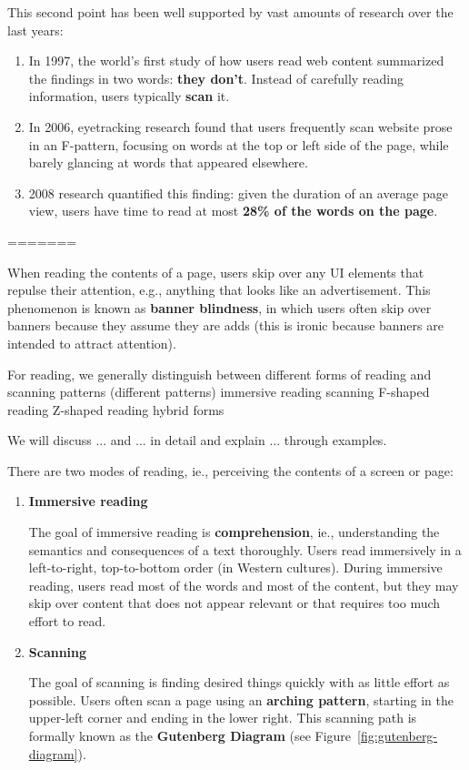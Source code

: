 This second point has been well supported by vast amounts of research over the last years:
\begin{enumerate}
	\item In 1997, the world's first study of how users read web content summarized the findings in two words: \textbf{they don't}. Instead of carefully reading information, users typically \textbf{scan} it.
	\item In 2006, eyetracking research found that users frequently scan website prose in an F-pattern, focusing on words at the top or left side of the page, while barely glancing at words that appeared elsewhere.
	\item 2008 research quantified this finding: given the duration of an average page view, users have time to read at most \textbf{28\% of the words on the page}.
\end{enumerate}

=======

When reading the contents of a page, users skip over any UI elements that repulse their attention, e.g., anything that looks like an advertisement. This phenomenon is known as \textbf{banner blindness}, in which users often skip over banners because they assume they are adds (this is ironic because banners are intended to attract attention).



For reading, we generally distinguish between different forms of reading and scanning patterns (different patterns)
immersive reading
scanning
F-shaped reading
Z-shaped reading
hybrid forms

We will discuss ... and ... in detail and explain ... through examples.

There are two modes of reading, ie., perceiving the contents of a screen or page:
\begin{enumerate}
	\item \textbf{Immersive reading} \par The goal of immersive reading is \textbf{comprehension}, ie., understanding the semantics and consequences of a text thoroughly.
	Users read immersively in a left-to-right, top-to-bottom order (in Western cultures).
	During immersive reading, users read most of the words and most of the content, but they may skip over content that does not appear relevant or that requires too much effort to read.
	
	\item \textbf{Scanning} \par The goal of scanning is finding desired things quickly with as little effort as possible.
	Users often scan a page using an \textbf{arching pattern}, starting in the upper-left corner and ending in the lower right.
	This scanning path is formally known as the \textbf{Gutenberg Diagram} (see Figure~\ref{fig:gutenberg-diagram}).
	
\end{enumerate}

